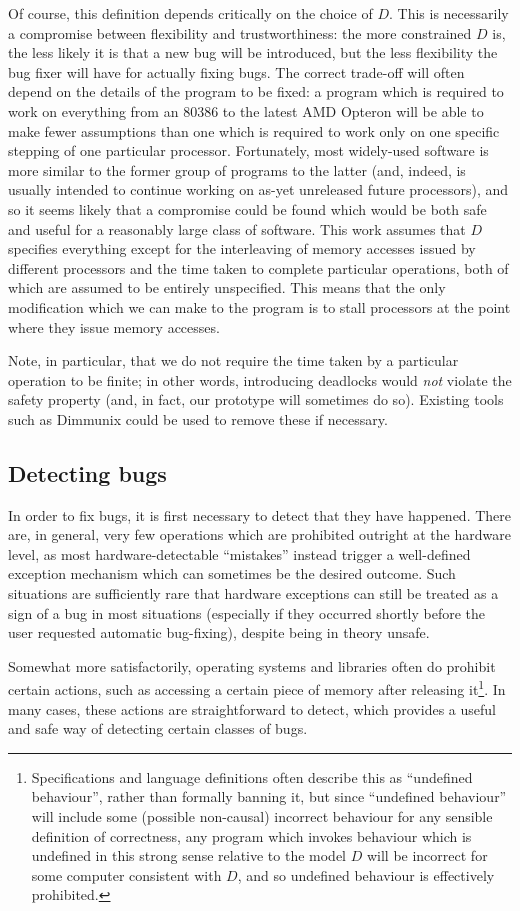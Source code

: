 \documentclass[10pt,a4paper]{report}
\begin{document}
Of course, this definition depends critically on the choice of $D$.
This is necessarily a compromise between flexibility and
trustworthiness: the more constrained $D$ is, the less likely it is
that a new bug will be introduced, but the less flexibility the bug
fixer will have for actually fixing bugs.  The correct trade-off will
often depend on the details of the program to be fixed: a program
which is required to work on everything from an 80386 to the latest
AMD Opteron will be able to make fewer assumptions than one which is
required to work only on one specific stepping of one particular
processor.  Fortunately, most widely-used software is more similar to
the former group of programs to the latter (and, indeed, is usually
intended to continue working on as-yet unreleased future processors),
and so it seems likely that a compromise could be found which would be
both safe and useful for a reasonably large class of software.  This
work assumes that $D$ specifies everything except for the interleaving
of memory accesses issued by different processors and the time taken
to complete particular operations, both of which are assumed to be
entirely unspecified.  This means that the only modification which we
can make to the program is to stall processors at the point where they
issue memory accesses.

Note, in particular, that we do not require the time taken by a
particular operation to be finite; in other words, introducing
deadlocks would \emph{not} violate the safety property (and, in fact,
our prototype will sometimes do so).  Existing tools such as
Dimmunix\needCite{} could be used to remove these if necessary.

\subsection{Detecting bugs}

In order to fix bugs, it is first necessary to detect that they have
happened.  There are, in general, very few operations which are
prohibited outright at the hardware level, as most hardware-detectable
``mistakes'' instead trigger a well-defined exception mechanism which
can sometimes be the desired outcome.  Such situations are
sufficiently rare that hardware exceptions can still be treated as a
sign of a bug in most situations (especially if they occurred shortly
before the user requested automatic bug-fixing), despite being in
theory unsafe.

Somewhat more satisfactorily, operating systems and libraries often do
prohibit certain actions, such as accessing a certain piece of memory
after releasing it\footnote{Specifications and language definitions
  often describe this as ``undefined behaviour'', rather than formally
  banning it, but since ``undefined behaviour'' will include some
  (possible non-causal) incorrect behaviour for any sensible
  definition of correctness, any program which invokes behaviour which
  is undefined in this strong sense relative to the model $D$ will be
  incorrect for some computer consistent with $D$, and so undefined
  behaviour is effectively prohibited.}.  In many cases, these actions
are straightforward to detect, which provides a useful and safe way of
detecting certain classes of bugs.
\end{document}
